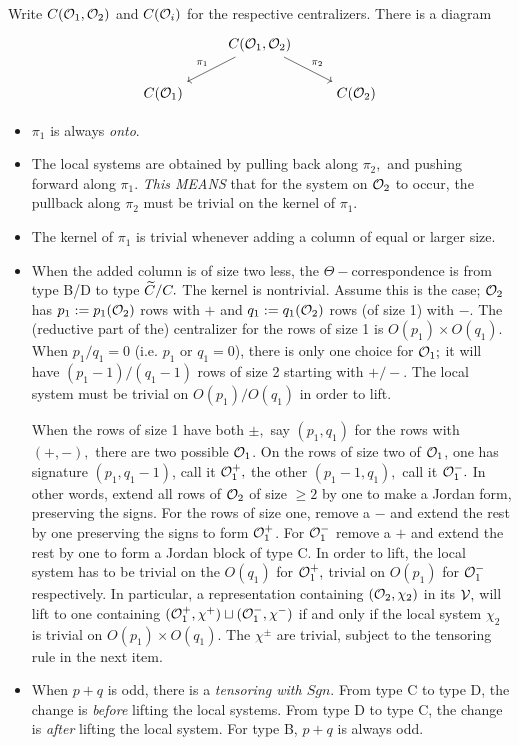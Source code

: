\documentclass[11pt ,reqno]{amsart}
\begin{document}
Write $C(\mathcal O_1,\mathcal O_2)$ and $C({\mathcal O}_i)$ for the respective
centralizers. There is a diagram
\begin{equation}
  \label{eq:kernel}
\begin{tikzcd}
&\arrow[dl,"\pi_1" ']C(\CO_1,\CO_2)\arrow[rd,"\pi_2"]&\\
C(\CO_1)&& C(\CO_2)
\end{tikzcd}  
\end{equation}
\begin{itemize}
\item $\pi_1$ is always \textit{onto}.
\item The local systems are obtained by pulling back along $\pi_2,$
  and pushing forward along $\pi_1.$ 
  \textit{This MEANS} that for the system on $\mathcal O_2$ to occur,
the pullback along $\pi_2$ must be trivial on the kernel of $\pi_1.$ 
\item The kernel of $\pi_1$ is trivial whenever adding a column of equal or larger size.
\item When the added column is of size two less, the
  $\Theta-$correspondence is from type B/D to type ${\widetilde C}/C.$ The kernel is
  nontrivial. Assume this is the case; ${\mathcal O}_2$ has
  $p_1:=p_1(\mathcal O_2)$ rows with $+$ and   $q_1:=q_1(\mathcal O_2)$ rows (of size 1) 
  with $-$. The (reductive part of the) centralizer for the rows of
  size 1 is $O(p_1)\times O(q_1).$ When   $p_1/q_1=0$
(i.e. $p_1$ or $q_1=0$),  there is only one choice for ${\mathcal O}_1;$ it will have
  $(p_1-1)/(q_1-1)$  rows of size 2 starting with $+/-.$  The local
  system must be trivial on $O(p_1)/O(q_1)$ in order to lift.

  When the
  rows of size 1 have both $\pm,$ say $(p_1,q_1)$ for the rows
  with $(+,-),$ there are two possible ${\mathcal O}_1$. On the rows of size
  two of $\mathcal O_1$, one has signature   $(p_1,q_1-1)$, call it ${\mathcal O}_1^+,$ the other $(p_1-1,q_1),$ call it
  ${\mathcal O}_1^-.$ In other words, extend all rows of $\mathcal O_2$ of size $\ge 2$ by one
  to make a Jordan form, preserving the signs. For the rows of size one, remove a $-$ and
  extend the rest by one preserving the signs to form $\mathcal O_1^+$. For $\mathcal O_1^-$ remove a $+$ and extend
  the rest by one to form a Jordan block of type C.
  In order to lift, the local system has to be trivial on the $O(q_1)$ for
  ${\mathcal O}_1^+,$  trivial on $O(p_1)$  for ${\mathcal O}_1^-$ respectively.
  In particular, a representation containing $({\mathcal O}_2,\chi_2)$ in its ${\mathcal V},$
  will lift to one containing $({\mathcal O}_1^+,\chi^+)\sqcup
  (\mathcal O_1^-,\chi^-)$ if and only if the local system $\chi_2$ is
  trivial on  $O(p_1)\times   O(q_1).$ The $\chi^\pm$ are trivial,
  subject to the tensoring rule in the next item.
\item {\clrblu When $p+q$ is odd, there is a \textit{tensoring with
      $Sgn$}. From type C to type D, the change is  \textit{before}
    lifting the local systems. From type D to type C, the change is
    \textit{after} lifting the local system. For type B, $p+q$ is
    always odd.} 
  

\end{itemize}
\end{document}
